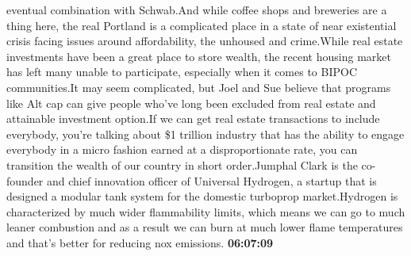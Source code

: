\documentclass{article}%
\begin{document}
eventual combination with Schwab.And while coffee shops and breweries are a thing here, the real Portland is a complicated place in a state of near existential crisis facing issues around affordability, the unhoused and crime.While real estate investments have been a great place to store wealth, the recent housing market has left many unable to participate, especially when it comes to BIPOC communities.It may seem complicated, but Joel and Sue believe that programs like Alt cap can give people who've long been excluded from real estate and attainable investment option.If we can get real estate transactions to include everybody, you're talking about \$1 trillion industry that has the ability to engage everybody in a micro fashion earned at a disproportionate rate, you can transition the wealth of our country in short order.Jumphal Clark is the co{-}founder and chief innovation officer of Universal Hydrogen, a startup that is designed a modular tank system for the domestic turboprop market.Hydrogen is characterized by much wider flammability limits, which means we can go to much leaner combustion and as a result we can burn at much lower flame temperatures and that's better for reducing nox emissions.%
\textbf{06:07:09}%
\end{document}
